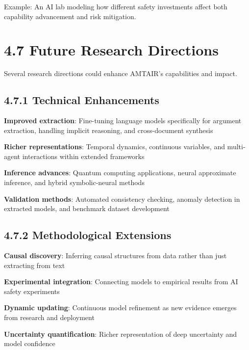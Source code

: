 \documentclass[
  11pt,
  letterpaper,
]{book}
\begin{document}
Example: An AI lab modeling how different safety investments affect both
capability advancement and risk mitigation.

\section*{4.7 Future Research Directions}\label{sec-future-research}


Several research directions could enhance AMTAIR's capabilities and
impact.

\subsection*{4.7.1 Technical Enhancements}\label{sec-technical-future}

\textbf{Improved extraction}: Fine-tuning language models specifically
for argument extraction, handling implicit reasoning, and cross-document
synthesis

\textbf{Richer representations}: Temporal dynamics, continuous
variables, and multi-agent interactions within extended frameworks

\textbf{Inference advances}: Quantum computing applications, neural
approximate inference, and hybrid symbolic-neural methods

\textbf{Validation methods}: Automated consistency checking, anomaly
detection in extracted models, and benchmark dataset development

\subsection*{4.7.2 Methodological
Extensions}\label{sec-methodological-future}

\textbf{Causal discovery}: Inferring causal structures from data rather
than just extracting from text

\textbf{Experimental integration}: Connecting models to empirical
results from AI safety experiments

\textbf{Dynamic updating}: Continuous model refinement as new evidence
emerges from research and deployment

\textbf{Uncertainty quantification}: Richer representation of deep
uncertainty and model confidence
\end{document}

